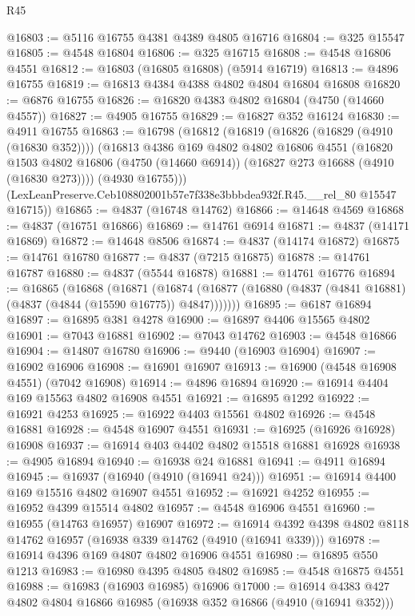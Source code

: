 \begin{lexlean}{R45}
\begin{coremodule}
@16803 := @5116 @16755 @4381 @4389 @4805 @16716
@16804 := @325 @15547
@16805 := @4548 @16804
@16806 := @325 @16715
@16808 := @4548 @16806 @4551
@16812 := @16803 (@16805 @16808) (@5914 @16719)
@16813 := @4896 @16755
@16819 := @16813 @4384 @4388 @4802 @4804 @16804 @16808
@16820 := @6876 @16755
@16826 := @16820 @4383 @4802 @16804 (@4750 (@14660 @4557))
@16827 := @4905 @16755
@16829 := @16827 @352 @16124
@16830 := @4911 @16755
@16863 := @16798
    (@16812
      (@16819
        (@16826 (@16829 (@4910 (@16830 @352))))
        (@16813
          @4386
          @169
          @4802
          @4802
          @16806
          @4551
          (@16820
            @1503
            @4802
            @16806
            (@4750 (@14660 @6914))
            (@16827 @273 @16688 (@4910 (@16830 @273))))
          (@4930 @16755)))
      (LexLeanPreserve.Ceb108802001b57e7f338e3bbbdea932f.R45.__rel_80 @15547 @16715))
@16865 := @4837 (@16748 @14762)
@16866 := @14648 @4569
@16868 := @4837 (@16751 @16866)
@16869 := @14761 @6914
@16871 := @4837 (@14171 @16869)
@16872 := @14648 @8506
@16874 := @4837 (@14174 @16872)
@16875 := @14761 @16780
@16877 := @4837 (@7215 @16875)
@16878 := @14761 @16787
@16880 := @4837 (@5544 @16878)
@16881 := @14761 @16776
@16894 := @16865
    (@16868
      (@16871
        (@16874 (@16877 (@16880 (@4837 (@4841 @16881) (@4837 (@4844 (@15590 @16775)) @4847)))))))
@16895 := @6187 @16894
@16897 := @16895 @381 @4278
@16900 := @16897 @4406 @15565 @4802
@16901 := @7043 @16881
@16902 := @7043 @14762
@16903 := @4548 @16866
@16904 := @14807 @16780
@16906 := @9440 (@16903 @16904)
@16907 := @16902 @16906
@16908 := @16901 @16907
@16913 := @16900 (@4548 @16908 @4551) (@7042 @16908)
@16914 := @4896 @16894
@16920 := @16914 @4404 @169 @15563 @4802 @16908 @4551
@16921 := @16895 @1292
@16922 := @16921 @4253
@16925 := @16922 @4403 @15561 @4802
@16926 := @4548 @16881
@16928 := @4548 @16907 @4551
@16931 := @16925 (@16926 @16928) @16908
@16937 := @16914 @403 @4402 @4802 @15518 @16881 @16928
@16938 := @4905 @16894
@16940 := @16938 @24 @16881
@16941 := @4911 @16894
@16945 := @16937 (@16940 (@4910 (@16941 @24)))
@16951 := @16914 @4400 @169 @15516 @4802 @16907 @4551
@16952 := @16921 @4252
@16955 := @16952 @4399 @15514 @4802
@16957 := @4548 @16906 @4551
@16960 := @16955 (@14763 @16957) @16907
@16972 := @16914 @4392 @4398 @4802 @8118 @14762 @16957 (@16938 @339 @14762 (@4910 (@16941 @339)))
@16978 := @16914 @4396 @169 @4807 @4802 @16906 @4551
@16980 := @16895 @550 @1213
@16983 := @16980 @4395 @4805 @4802
@16985 := @4548 @16875 @4551
@16988 := @16983 (@16903 @16985) @16906
@17000 := @16914 @4383 @427 @4802 @4804 @16866 @16985 (@16938 @352 @16866 (@4910 (@16941 @352)))

\end{coremodule}
\end{lexlean}
